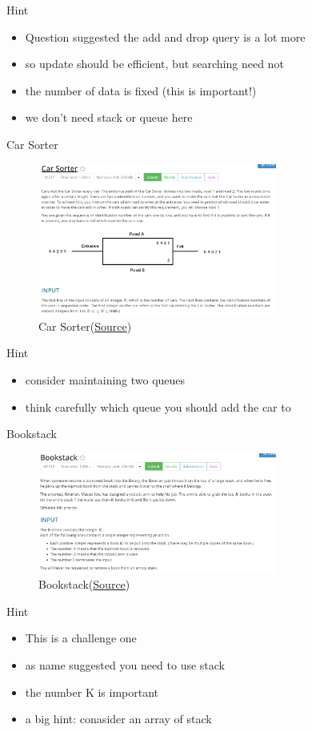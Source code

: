 \documentclass[10pt,xcolor={table,dvipsnames},t]{beamer}
\begin{document}
\begin{frame}{Hint}
  \begin{itemize}
    \item Question suggested the add and drop query is a lot more
    \item so update should be efficient, but searching need not
    \item the number of data is fixed (this is important!)
    \item we don't need stack or queue here
  \end{itemize}
\end{frame}

\begin{frame}{Car Sorter}
  \begin{figure}[h!]
    \includegraphics[width=0.7\textwidth]{Q4.png}
    \caption{Car Sorter(\href{https://judge.hkoi.org/task/01017}{Source})}
  \end{figure}
\end{frame}

\begin{frame}{Hint}
  \begin{itemize}
    \item consider maintaining two queues
    \item think carefully which queue you should add the car to
  \end{itemize}
\end{frame}

\begin{frame}{Bookstack}
  \begin{figure}[h!]
    \includegraphics[width=0.7\textwidth]{Q5.png}
    \caption{Bookstack(\href{https://judge.hkoi.org/task/M1313}{Source})}
  \end{figure}
\end{frame}

\begin{frame}{Hint}
  \begin{itemize}
    \item This is a challenge one
    \item as name suggested you need to use stack
    \item the number K is important
    \item a big hint: conasider an array of stack
  \end{itemize}
\end{frame}
\end{document}
